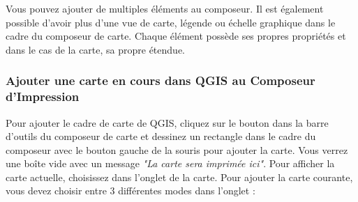 Vous pouvez ajouter de multiples éléments au composeur. Il est également possible d'avoir plus d'une vue de carte, légende ou échelle graphique dans le
cadre du composeur de carte. Chaque élément possède ses propres propriétés et dans le cas de la carte, sa propre étendue.

\subsubsection{Ajouter une carte en cours dans QGIS au Composeur d'Impression}

Pour ajouter le cadre de carte de QGIS, cliquez sur le bouton  dans la barre d'outils du composeur de carte et dessinez un rectangle dans le cadre du composeur avec le bouton gauche de la souris pour ajouter la carte. Vous verrez une boîte vide avec un message \textit{"La carte sera imprimée ici"}. Pour afficher la carte actuelle, choisissez
 dans l'onglet  de la carte.
Pour ajouter la carte courante, vous devez choisir entre 3 différentes modes dans l'onglet  :


